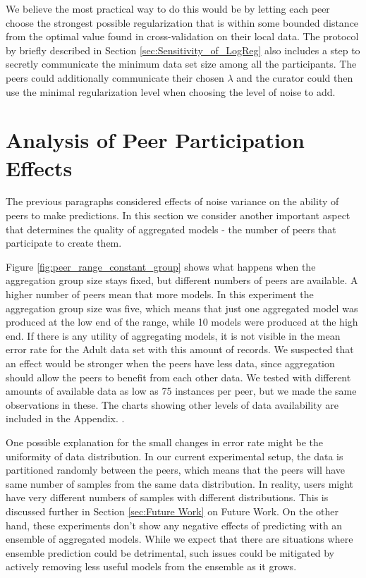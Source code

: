 We believe the most practical way to do this would be by letting each peer choose the strongest possible regularization that is within some bounded distance from the optimal value found in cross-validation on their local data. The protocol by \cite{pathak2010diffprivhomo} briefly described in Section \ref{sec:Sensitivity_of_LogReg} also includes a step to secretly communicate the minimum data set size among all the participants. The peers could additionally communicate their chosen $\lambda$ and the curator could then use the minimal regularization level when choosing the level of noise to add.

\section{Analysis of Peer Participation Effects}
\label{sec:aggregation_effects}

The previous paragraphs considered effects of noise variance on the ability of peers to make predictions. In this section we consider another important aspect that determines the quality of aggregated models - the number of peers that participate to create them. 

Figure \ref{fig:peer_range_constant_group} shows what happens when the aggregation group size stays fixed, but different numbers of peers are available. A higher number of peers mean that more models. In this experiment the aggregation group size was five, which means that just one aggregated model was produced at the low end of the range, while 10 models were produced at the high end. If there is any utility of aggregating models, it is not visible in the mean error rate for the Adult data set with this amount of records. We suspected that an effect would be stronger when the peers have less data, since aggregation should allow the peers to benefit from each other data. We tested with different amounts of available data as low as 75 instances per peer, but we made the same observations in these. The charts showing other levels of data availability are included in the Appendix.  .

One possible explanation for the small changes in error rate might be the uniformity of data distribution. In our current experimental setup, the data is partitioned randomly between the peers, which means that the peers will have same number of samples from the same data distribution. In reality, users might have very different numbers of samples with different distributions. This is discussed further in Section \ref{sec:Future Work} on Future Work. On the other hand, these experiments don't show any negative effects of predicting with an ensemble of aggregated models. While we expect that there are situations where ensemble prediction could be detrimental, such issues could be mitigated by actively removing less useful models from the ensemble as it grows.

